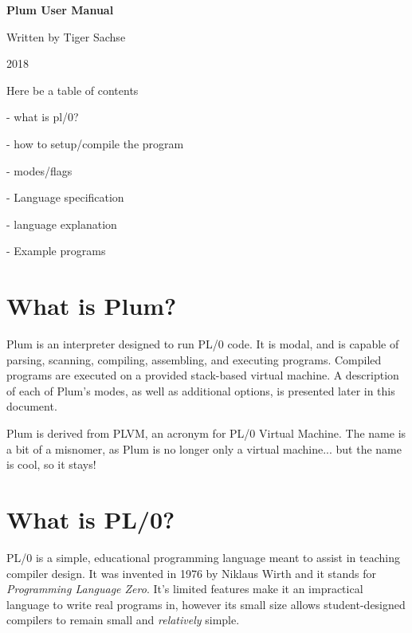 \documentclass[12pt]{memoir}
\begin{document}
\pagestyle{empty}

\begin{vplace}[.7]
\begin{center}
{\Huge
    \textbf{Plum User Manual}
}

{\Large 
    Written by Tiger Sachse

    2018
}
\end{center}
\end{vplace}

\pagebreak

Here be a table of contents

- what is pl/0?

- how to setup/compile the program

- modes/flags

- Language specification

- language explanation

- Example programs

\pagebreak

\pagestyle{plain}
\setcounter{page}{1}

\section*{What is Plum?}
Plum is an interpreter designed to run PL/0 code. It is modal, and is capable of parsing,
scanning, compiling, assembling, and executing programs. Compiled programs are executed
on a provided stack-based virtual machine. A description of each of Plum's modes, as well
as additional options, is presented later in this document.

Plum is derived from PLVM, an acronym for PL/0 Virtual Machine. The name is a bit of a
misnomer, as Plum is no longer only a virtual machine... but the name is cool, so it stays!

\section*{What is PL/0?}
PL/0 is a simple, educational programming language meant to assist in teaching compiler
design. It was invented in 1976 by Niklaus Wirth and it stands for
\textit{Programming Language Zero}. It's limited features make it an impractical language
to write real programs in, however its small size allows student-designed compilers to
remain small and \textit{relatively} simple.
\end{document}
